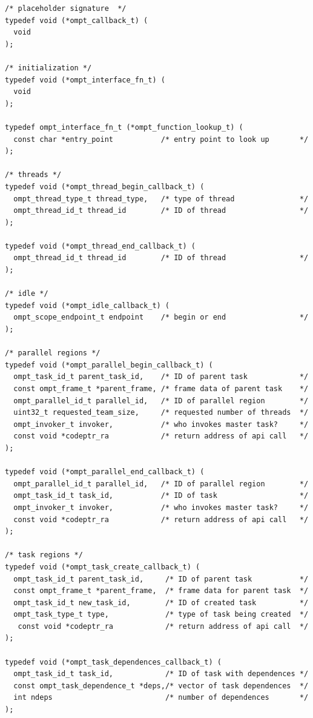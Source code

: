 \documentclass{article}
\begin{document}
{\begin{verbatim}
/* placeholder signature  */	
typedef void (*ompt_callback_t) (    
  void
);

/* initialization */
typedef void (*ompt_interface_fn_t) (
  void
);

typedef ompt_interface_fn_t (*ompt_function_lookup_t) (
  const char *entry_point           /* entry point to look up       */
);

/* threads */	
typedef void (*ompt_thread_begin_callback_t) (
  ompt_thread_type_t thread_type,   /* type of thread               */	   
  ompt_thread_id_t thread_id        /* ID of thread                 */
);
					   
typedef void (*ompt_thread_end_callback_t) (
  ompt_thread_id_t thread_id        /* ID of thread                 */
);

/* idle */					    						    
typedef void (*ompt_idle_callback_t) ( 
  ompt_scope_endpoint_t endpoint    /* begin or end                 */
);

/* parallel regions */								    							   	    
typedef void (*ompt_parallel_begin_callback_t) (
  ompt_task_id_t parent_task_id,    /* ID of parent task            */
  const ompt_frame_t *parent_frame, /* frame data of parent task    */
  ompt_parallel_id_t parallel_id,   /* ID of parallel region        */
  uint32_t requested_team_size,     /* requested number of threads  */
  ompt_invoker_t invoker,           /* who invokes master task?     */
  const void *codeptr_ra            /* return address of api call   */ 
);

typedef void (*ompt_parallel_end_callback_t) (
  ompt_parallel_id_t parallel_id,   /* ID of parallel region        */
  ompt_task_id_t task_id,           /* ID of task                   */
  ompt_invoker_t invoker,           /* who invokes master task?     */
  const void *codeptr_ra            /* return address of api call   */ 
);

/* task regions */
typedef void (*ompt_task_create_callback_t) ( 
  ompt_task_id_t parent_task_id,     /* ID of parent task           */
  const ompt_frame_t *parent_frame,  /* frame data for parent task  */
  ompt_task_id_t new_task_id,        /* ID of created task          */
  ompt_task_type_t type,             /* type of task being created  */ 
   const void *codeptr_ra            /* return address of api call  */ 
);

typedef void (*ompt_task_dependences_callback_t) (                                   
  ompt_task_id_t task_id,            /* ID of task with dependences */
  const ompt_task_dependence_t *deps,/* vector of task dependences  */
  int ndeps                          /* number of dependences       */
);


\end{verbatim}}
\end{document}
